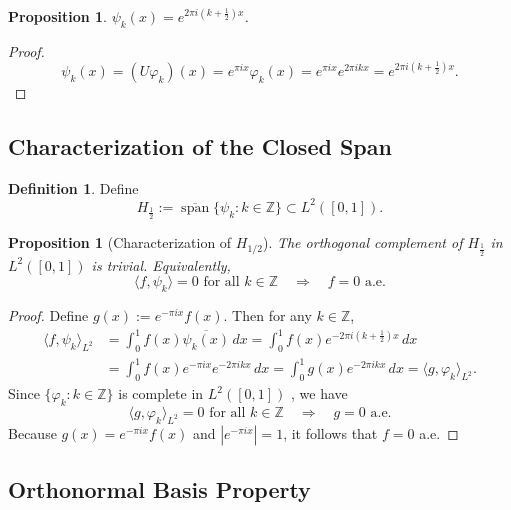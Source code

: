 \documentclass[11pt]{amsart}
\newtheorem{proposition}[theorem]{Proposition}
\theoremstyle{definition}
\newtheorem{definition}[theorem]{Definition}
\theoremstyle{remark}
\begin{document}
\begin{proposition}
\label{prop:half-integer-modes}
$\psi_k(x) = e^{2\pi i (k+\frac{1}{2})x}$.
\end{proposition}

\begin{proof}
\[
\psi_k(x) = (U\varphi_k)(x) = e^{\pi i x} \varphi_k(x) = e^{\pi i x} e^{2\pi i k x} = e^{2\pi i (k+\frac{1}{2})x}.
\]
\end{proof}

\subsection{Characterization of the Closed Span}

\begin{definition}
Define
\[
H_{\frac{1}{2}} := \overline{\operatorname{span}}\{\psi_k : k \in \mathbb{Z}\} \subset L^2([0,1]).
\]
\end{definition}

\begin{proposition}[Characterization of $H_{1/2}$]
\label{prop:trivial-orthogonal-complement}
The orthogonal complement of $H_{\frac{1}{2}}$ in $L^2([0,1])$ is trivial. Equivalently,
\[
\langle f, \psi_k \rangle = 0 \text{ for all } k \in \mathbb{Z} \quad \Longrightarrow \quad f = 0 \text{ a.e.}
\]
\end{proposition}

\begin{proof}
Define $g(x) := e^{-\pi i x} f(x)$. Then for any $k \in \mathbb{Z}$,
\begin{align*}
\langle f, \psi_k \rangle_{L^2} &= \int_0^1 f(x) \overline{\psi_k(x)} \, dx = \int_0^1 f(x) e^{-2\pi i (k+\frac{1}{2})x} \, dx \\
&= \int_0^1 f(x) e^{-\pi i x} e^{-2\pi i k x} \, dx = \int_0^1 g(x) e^{-2\pi i k x} \, dx = \langle g, \varphi_k \rangle_{L^2}.
\end{align*}
Since $\{\varphi_k : k \in \mathbb{Z}\}$ is complete in $L^2([0,1])$ \cite{reed-simon-v2}, we have
\[
\langle g, \varphi_k \rangle_{L^2} = 0 \text{ for all } k \in \mathbb{Z} \quad \Longrightarrow \quad g = 0 \text{ a.e.}
\]
Because $g(x) = e^{-\pi i x} f(x)$ and $|e^{-\pi i x}| = 1$, it follows that $f = 0$ a.e.
\end{proof}

\subsection{Orthonormal Basis Property}
\end{document}
